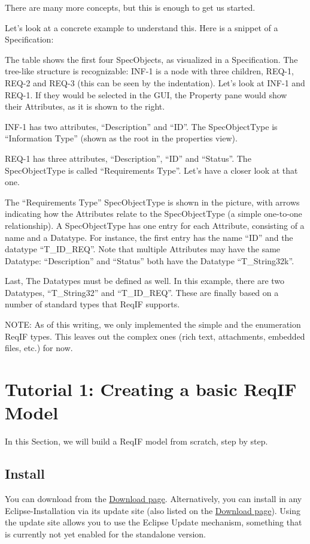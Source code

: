 There are many more concepts, but this is enough to get us started.

Let's look at a concrete example to understand this. Here is a snippet
of a Specification:

The table shows the first four SpecObjects, as visualized in a
Specification. The tree-like structure is recognizable: INF-1 is a node
with three children, REQ-1, REQ-2 and REQ-3 (this can be seen by the
indentation). Let's look at INF-1 and REQ-1. If they would be selected
in the GUI, the Property pane would show their Attributes, as it is
shown to the right.

INF-1 has two attributes, ``Description'' and ``ID''. The SpecObjectType
is ``Information Type'' (shown as the root in the properties view).

REQ-1 has three attributes, ``Description'', ``ID'' and ``Status''. The
SpecObjectType is called ``Requirements Type''. Let's have a closer look
at that one.

The ``Requirements Type'' SpecObjectType is shown in the picture, with
arrows indicating how the Attributes relate to the SpecObjectType (a
simple one-to-one relationship). A SpecObjectType has one entry for each
Attribute, consisting of a name and a Datatype. For instance, the first
entry has the name ``ID'' and the datatype ``T\_ID\_REQ''. Note that
multiple Attributes may have the same Datatype: ``Description'' and
``Status'' both have the Datatype ``T\_String32k''.

Last, The Datatypes must be defined as well. In this example, there are
two Datatypes, ``T\_String32'' and ``T\_ID\_REQ''. These are finally
based on a number of standard types that ReqIF supports.

NOTE: As of this writing, we only implemented the simple and the
enumeration ReqIF types. This leaves out the complex ones (rich text,
attachments, embedded files, etc.) for now.

\section{Tutorial 1: Creating a basic ReqIF Model}

In this Section, we will build a ReqIF model from scratch, step by step.

\subsection{Install \pror{}}

You can download \pror{} from the
\href{http://www.eclipse.org/rmf/download.php}{Download page}.
Alternatively, you can install \pror{} in any Eclipse-Installation via its
update site (also listed on the
\href{http://www.eclipse.org/rmf/download.php}{Download page}). Using
the update site allows you to use the Eclipse Update mechanism,
something that is currently not yet enabled for the standalone version.

